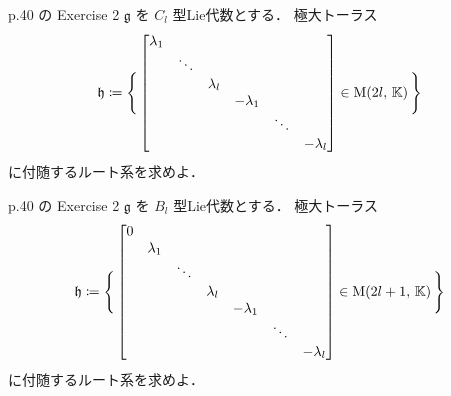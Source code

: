 \documentclass{ltjsarticle}
\theoremstyle{mystyle} %
\numberwithin{equation}{section}
\begin{document}
\begin{myproblem}[label=ex:2-8-2C]{p.40 の Exercise 2}
    $\mathfrak{g}$ を $C_l$ 型Lie代数とする．
    極大トーラス
    \begin{align}
        \mathfrak{h} \coloneqq \Biggl\{\, \mqty[\dmat{\lambda_1,\ddots,\lambda_{l},-\lambda_{1},\ddots,-\lambda_{l}}] \in \Mat{2l}{\mathbb{K}} \,\Biggr\} 
    \end{align}
    に付随するルート系を求めよ．
\end{myproblem}


\begin{myproblem}[label=ex:2-8-2B]{p.40 の Exercise 2}
    $\mathfrak{g}$ を $B_l$ 型Lie代数とする．
    極大トーラス
    \begin{align}
        \mathfrak{h} \coloneqq \Biggl\{\, \mqty[\dmat{0,\lambda_1,\ddots,\lambda_{l},-\lambda_{1},\ddots,-\lambda_{l}}] \in \Mat{2l+1}{\mathbb{K}} \,\Biggr\} 
    \end{align}
    に付随するルート系を求めよ．
\end{myproblem}
\end{document}
